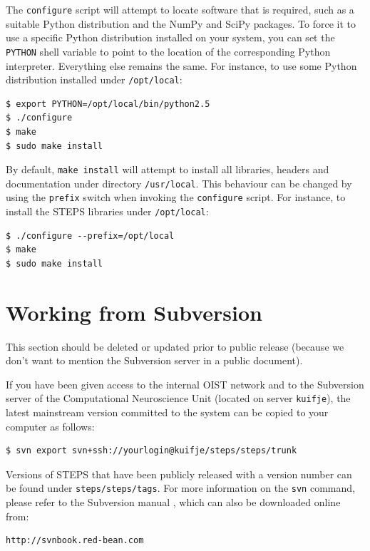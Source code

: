 \documentclass[a4paper,12pt]{book}
\begin{document}
The \texttt{configure} script will attempt to locate software that is required, such as a suitable Python distribution and the NumPy and SciPy packages. To force it to use a specific Python distribution installed on your system, you can set the \texttt{PYTHON} shell variable to point to the location of the corresponding Python interpreter. Everything else remains the same. For instance, to use some Python distribution installed under \texttt{/opt/local}:

\begin{verbatim}
$ export PYTHON=/opt/local/bin/python2.5
$ ./configure
$ make
$ sudo make install
\end{verbatim}

By default, \texttt{make install} will attempt to install all libraries, headers and documentation under directory \texttt{/usr/local}. This behaviour can be changed by using the \texttt{prefix} switch when invoking the \texttt{configure} script. For instance, to install the STEPS libraries under \texttt{/opt/local}:

\begin{verbatim}
$ ./configure --prefix=/opt/local
$ make
$ sudo make install
\end{verbatim}

\section{Working from Subversion}

This section should be deleted or updated prior to public release (because we don't want to mention the Subversion server in a public document).

If you have been given access to the internal OIST network and to the Subversion server of the Computational Neuroscience Unit (located on server \texttt{kuifje}), the latest mainstream version committed to the system can be copied to your computer as follows:

\begin{verbatim}
$ svn export svn+ssh://yourlogin@kuifje/steps/steps/trunk 
\end{verbatim}

Versions of STEPS that have been publicly released with a version number can be found under \texttt{steps/steps/tags}. For more information on the \texttt{svn} command, please refer to the Subversion manual \cite{Pilato:VersionControlWithSubversion:2004}, which can also be downloaded online from:

\begin{verbatim}
http://svnbook.red-bean.com
\end{verbatim}
\end{document}
